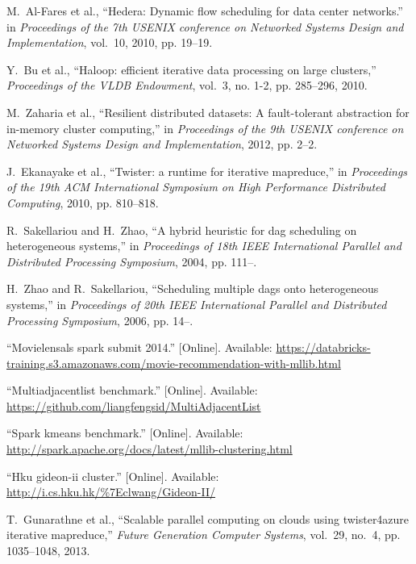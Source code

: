 \documentclass[10pt,journal,compsoc]{IEEEtran}
\begin{document}
\begin{thebibliography}{40}
M.~Al-Fares et al., ``Hedera:
  Dynamic flow scheduling for data center networks.'' in \emph{Proceedings of
  the 7th USENIX conference on Networked Systems Design and Implementation},
  vol.~10, 2010, pp. 19--19.

Y.~Bu et al., ``Haloop: efficient iterative
  data processing on large clusters,'' \emph{Proceedings of the VLDB
  Endowment}, vol.~3, no. 1-2, pp. 285--296, 2010.

M.~Zaharia et al., ``Resilient distributed datasets: A fault-tolerant
  abstraction for in-memory cluster computing,'' in \emph{Proceedings of the
  9th USENIX conference on Networked Systems Design and Implementation}, 2012,
  pp. 2--2.

J.~Ekanayake et al.,
  ``Twister: a runtime for iterative mapreduce,'' in \emph{Proceedings of the
  19th ACM International Symposium on High Performance Distributed Computing},
  2010, pp. 810--818.

R.~Sakellariou and H.~Zhao, ``A hybrid heuristic for dag scheduling on
  heterogeneous systems,'' in \emph{Proceedings of 18th IEEE International
  Parallel and Distributed Processing Symposium}, 2004, pp. 111--.

H.~Zhao and R.~Sakellariou, ``Scheduling multiple dags onto heterogeneous
  systems,'' in \emph{Proceedings of 20th IEEE International Parallel and
  Distributed Processing Symposium}, 2006, pp. 14--.

\BIBentryALTinterwordspacing
``Movielensals spark submit 2014.'' [Online]. Available:
  \url{https://databricks-training.s3.amazonaws.com/movie-recommendation-with-mllib.html}
\BIBentrySTDinterwordspacing

\BIBentryALTinterwordspacing
``Multiadjacentlist benchmark.'' [Online]. Available:
  \url{https://github.com/liangfengsid/MultiAdjacentList}
\BIBentrySTDinterwordspacing

\BIBentryALTinterwordspacing
``Spark kmeans benchmark.'' [Online]. Available:
  \url{http://spark.apache.org/docs/latest/mllib-clustering.html}
\BIBentrySTDinterwordspacing

\BIBentryALTinterwordspacing
``Hku gideon-ii cluster.'' [Online]. Available:
  \url{http://i.cs.hku.hk/\%7Eclwang/Gideon-II/}
\BIBentrySTDinterwordspacing

T.~Gunarathne et al., ``Scalable parallel computing on
  clouds using twister4azure iterative mapreduce,'' \emph{Future Generation
  Computer Systems}, vol.~29, no.~4, pp. 1035--1048, 2013.


\end{thebibliography}
\end{document}
